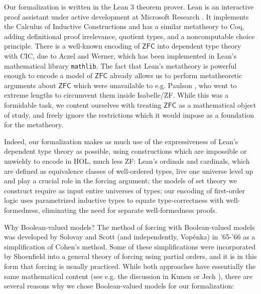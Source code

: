\documentclass[a4paper,USenglish,cleveref, autoref]{lipics-v2019}
\newcommand{\lil}{\lstinline}
\theoremstyle{definition}
\begin{document}
Our formalization is written in the Lean 3 theorem prover. Lean is an interactive proof assistant under active development at Microsoft Research \cite{de2015lean} \cite{sebastian-slides}. It implements the Calculus of Inductive Constructions and has a similar metatheory to Coq, adding definitional proof irrelevance, quotient types, and a noncomputable choice principle. There is a well-known encoding of $\mathsf{ZFC}$ into dependent type theory with CIC, due to Aczel and Werner, which has been implemented in Lean's mathematical library \lil{mathlib}. The fact that Lean's metatheory is powerful enough to encode a model of $\mathsf{ZFC}$ already allows us to perform metatheoretic arguments about $\mathsf{ZFC}$ which were unavailable to e.g. Paulson \cite{paulson2003relative}, who went to extreme lengths to circumvent them inside Isabelle/ZF. While this was a formidable task, we content ourselves with treating $\mathsf{ZFC}$ as a mathematical object of study, and freely ignore the restrictions which it would impose as a foundation for the metatheory.

Indeed, our formalization makes as much use of the expressiveness of Lean's dependent type theory as possible, using constructions which are impossible or unwieldy to encode in HOL, much less ZF: Lean's ordinals and cardinals, which are defined as equivalence classes of well-ordered types, live one universe level up and play a crucial role in the forcing argument; the models of set theory we construct require as input entire universes of types; our encoding of first-order logic uses parametrized inductive types to equate type-correctness with well-formedness, eliminating the need for separate well-formedness proofs.

Why Boolean-valued models? The method of forcing with Boolean-valued models was developed by Solovay and Scott (and independently, Vop{\v e}nka) in '65-'66 \cite{scott1} \cite{vopenka1} as a simplification of Cohen's method. Some of these simplifications were incorporated by Shoenfield \cite{solovay1} into a general theory of forcing using partial orders, and it is in this form that forcing is usually practiced. While both approaches have essentially the same mathematical content (see e.g. the discussion in Kunen \cite{kunen1} or Jech \cite{jech1}), there are several reasons why we chose Boolean-valued models for our formalization:
\end{document}
